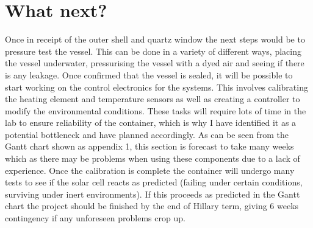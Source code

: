 \documentclass[a4paper,11pt]{article}
\begin{document}
\section{What next?}
Once in receipt of the outer shell and quartz window the next steps would be to pressure test the vessel. This can be done in a variety of different ways, placing the vessel underwater, pressurising the vessel with a dyed air and seeing if there is any leakage. Once confirmed that the vessel is sealed, it will be possible to start working on the control electronics for the systems. This involves calibrating the heating element and temperature sensors as well as creating a controller to modify the environmental conditions. These tasks will require lots of time in the lab to ensure reliability of the container, which is why I have identified it as a potential bottleneck and have planned accordingly. As can be seen from the Gantt chart shown as appendix 1, this section is forecast to take many weeks which as there may be problems when using these components due to a lack of experience. Once the calibration is complete the container will undergo many tests to see if the solar cell reacts as predicted (failing under certain conditions, surviving under inert environments). If this proceeds as predicted in the Gantt chart the project should be finished by the end of Hillary term, giving 6 weeks contingency if any unforeseen problems crop up. 


\end{document}
